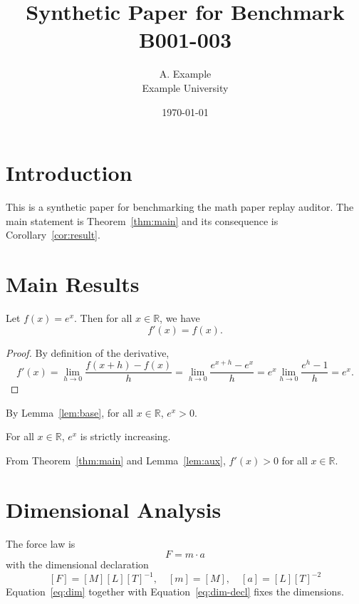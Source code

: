 \documentclass{article}
\title{Synthetic Paper for Benchmark B001-003}
\author{A. Example \\ Example University}
\date{\today}
\begin{document}
\maketitle

\section{Introduction}
This is a synthetic paper for benchmarking the math paper replay auditor.
The main statement is Theorem~\ref{thm:main} and its consequence is
Corollary~\ref{cor:result}.

\section{Main Results}
\begin{theorem}
\label{thm:main}
Let $f(x) = e^x$. Then for all $x \in \mathbb{R}$, we have
\begin{equation}
\label{eq:main}
f'(x) = f(x).
\end{equation}
\end{theorem}

\begin{proof}
By definition of the derivative,
\begin{equation}
\label{eq:deriv}
f'(x) = \lim_{h \to 0} \frac{f(x+h) - f(x)}{h} = \lim_{h \to 0} \frac{e^{x+h} - e^x}{h} = e^x \lim_{h \to 0} \frac{e^h - 1}{h} = e^x.
\end{equation}
\end{proof}

\begin{lemma}
\label{lem:aux}
By Lemma~\ref{lem:base}, for all $x \in \mathbb{R}$, $e^x > 0$.
\end{lemma}

\begin{lemma}
\label{lem:base}
For all $x \in \mathbb{R}$, $e^x$ is strictly increasing.
\end{lemma}

\begin{corollary}
\label{cor:result}
From Theorem~\ref{thm:main} and Lemma~\ref{lem:aux}, $f'(x) > 0$ for all $x \in \mathbb{R}$.
\end{corollary}

\section{Dimensional Analysis}
The force law is
\begin{equation}
\label{eq:dim}
F = m \cdot a
\end{equation}
with the dimensional declaration
\begin{equation}
\label{eq:dim-decl}
[F] = [M][L][T]^{-1}, \quad [m] = [M], \quad [a] = [L][T]^{-2}
\end{equation}
Equation~\ref{eq:dim} together with Equation~\ref{eq:dim-decl} fixes the dimensions.
\end{document}
